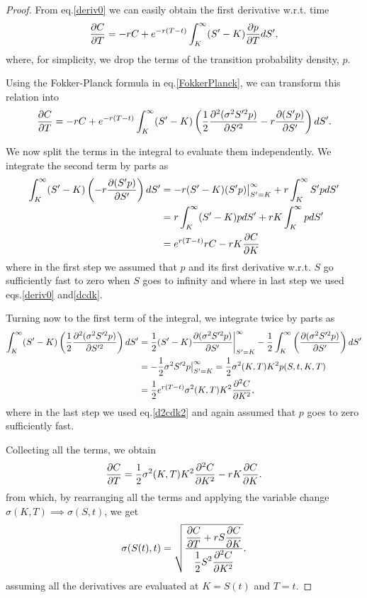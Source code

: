 \begin{proof}
From eq.\eqref{deriv0} we can easily obtain the first derivative w.r.t. time
\begin{equation}
\pdv{C}{T}=-rC+e^{-r(T-t)}\int_K^\infty(S'-K)\pdv{p}{T}dS',
\end{equation}
\noindent where, for simplicity, we drop the terms of the transition probability density, $p$.

Using the Fokker-Planck formula in eq.\eqref{FokkerPlanck}, we can transform this relation into
\begin{equation}
\pdv{C}{T}=-rC+e^{-r(T-t)}\int_K^\infty(S'-K)\left(\frac{1}{2}\pdv{^2(\sigma^2S'^2p)}{S'^2}-r\pdv{(S'p)}{S'}\right)dS'.
\end{equation}

We now split the terms in the integral to evaluate them independently. We integrate the second term by parts as
\begin{equation}
\begin{split}
\int_K^\infty(S'-K)\left(-r\pdv{(S'p)}{S'}\right)dS'&=-r(S'-K)(S'p)\big|_{S'=K}^\infty+r\int_K^\infty S'p dS'\\
&=r\int_K^\infty (S'-K)p dS'+rK\int_K^\infty p dS'\\
&=e^{r(T-t)}rC-rK\pdv{C}{K}
\end{split}
\end{equation}
\noindent where in the first step we assumed that $p$ and its first derivative w.r.t. $S$ go sufficiently fast to zero when $S$ goes to infinity and where in last step we used eqs.\eqref{deriv0} and\eqref{dcdk}.

Turning now to the first term of the integral, we integrate twice by parts as
\begin{equation}
\begin{split}
\int_K^\infty(S'-K)\left(\frac{1}{2}\pdv{^2(\sigma^2S'^2p)}{S'^2}\right)dS'&=\frac{1}{2}(S'-K)\pdv{(\sigma^2S'^2p)}{S'}\bigg|_{S'=K}^\infty-\frac{1}{2}\int_K^\infty\left(\pdv{(\sigma^2S'^2p)}{S'}\right)dS'\\
&=-\frac{1}{2}\sigma^2S'^2p\big|_{S'=K}^\infty=\frac{1}{2}\sigma^2(K,T)K^2p(S,t,K,T)\\
&=\frac{1}{2}e^{r(T-t)}\sigma^2(K,T)K^2\pdv{^2C}{K^2},
\end{split}
\end{equation}
\noindent where in the last step we used eq.\eqref{d2cdk2} and again assumed that $p$ goes to zero sufficiently fast.

Collecting all the terms, we obtain
\begin{equation}
\pdv{C}{T}=\frac{1}{2}\sigma^2(K,T)K^2\pdv{^2C}{K^2}-rK\pdv{C}{K}.
\end{equation}
\noindent from which, by rearranging all the terms and applying the variable change $\sigma(K,T)\implies \sigma(S,t)$, we get
\begin{equation}
\sigma(S(t),t)=\sqrt{\frac{\displaystyle\pdv{C}{T}+rS\pdv{C}{K}}{\displaystyle\frac{1}{2}S^2\pdv{^2C}{K^2}}}.
\end{equation}
\noindent assuming all the derivatives are evaluated at $K=S(t)$ and $T=t$.

\end{proof}

